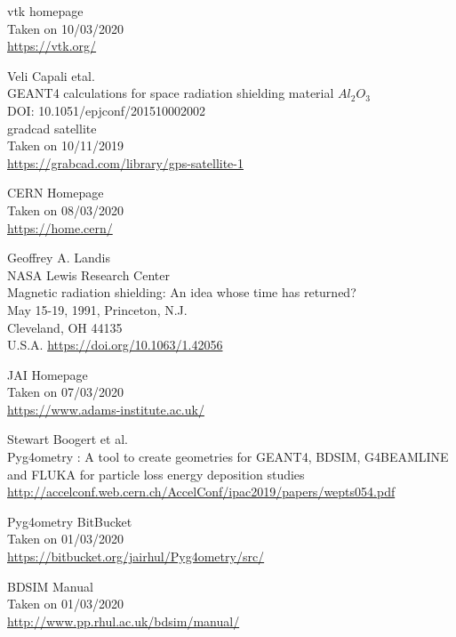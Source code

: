 \documentclass[12pt,a4paper]{article}
\begin{document}
\newpage
\newpage
\footnotesize
\begin{thebibliography}{1}

	vtk homepage\\
	Taken on 10/03/2020\\
	\url{https://vtk.org/}

	Veli Capali etal.\\
	GEANT4 calculations for space radiation shielding material $Al_2O_3$\\
	DOI: 10.1051/epjconf/201510002002\\

	gradcad satellite\\
	Taken on 10/11/2019\\	
	\url{https://grabcad.com/library/gps-satellite-1}

	CERN Homepage\\
	Taken on 08/03/2020\\
	\url{https://home.cern/}
	
	Geoffrey A. Landis\\
	NASA Lewis Research Center\\
	Magnetic radiation shielding: An idea whose time has returned?\\
	May 15-19, 1991, Princeton, N.J.\\
	Cleveland, OH 44135\\
	U.S.A.
	\url{https://doi.org/10.1063/1.42056}
	
	JAI Homepage\\
	Taken on 07/03/2020\\
	\url{https://www.adams-institute.ac.uk/}

	Stewart Boogert et al.\\
	Pyg4ometry : A tool to create geometries for GEANT4, BDSIM, G4BEAMLINE and FLUKA for particle loss energy deposition studies\\
	\url{http://accelconf.web.cern.ch/AccelConf/ipac2019/papers/wepts054.pdf}

	Pyg4ometry BitBucket\\
	Taken on 01/03/2020\\
	\url{https://bitbucket.org/jairhul/Pyg4ometry/src/}
	
	\bibitem{}
		BDSIM Manual\\
		Taken on 01/03/2020\\
		\url{http://www.pp.rhul.ac.uk/bdsim/manual/}
		

\end{thebibliography}
\end{document}
